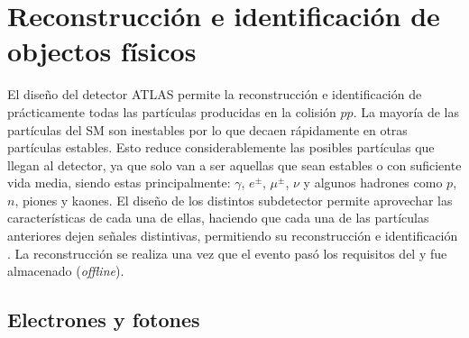 \chapter{Reconstrucción e identificación de objectos físicos} %



El diseño del detector ATLAS permite la reconstrucción e identificación de prácticamente todas las
partículas producidas en la colisión $pp$. 
La mayoría de las partículas del SM son inestables por lo que decaen rápidamente en otras partículas estables. Esto reduce considerablemente las posibles partículas que llegan
al detector, ya que solo van a ser aquellas que sean estables o con suficiente vida media, siendo estas principalmente: $\gamma$, $e^{\pm}$, $\mu^{\pm}$, $\nu$ y algunos hadrones
como $p$, $n$, piones y kaones. El diseño de los distintos subdetector permite aprovechar las
características de cada una de ellas, haciendo que cada una de las partículas anteriores dejen señales distintivas, permitiendo su reconstrucción e identificación . La
reconstrucción se realiza una vez que el evento pasó los requisitos del \trigger y fue almacenado
(\textit{offline}).




\section{Electrones y fotones}

